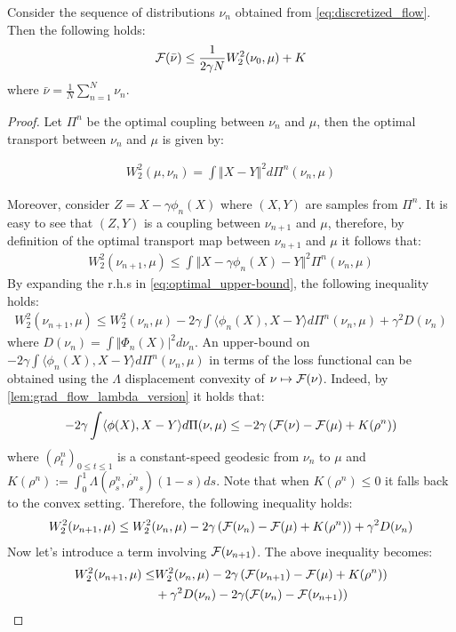 \begin{theorem}
	Consider the sequence of distributions $\nu_n$ obtained from \cref{eq:discretized_flow}. Then the following holds:
	\begin{align}
		{{\mathcal F}}(\bar{\nu})\leq \frac{1}{2\gamma N}W_2^2(\nu_0,\mu) +K
	\end{align}
	where $\bar{\nu}=\frac{1}{N}\sum_{n=1}^N \nu_n$.
\end{theorem}
\begin{proof}
Let $\Pi^n$ be the optimal coupling between $\nu_n$ and $\mu$, then the optimal transport between $\nu_n$ and $\mu$ is given by:

\begin{align}
	W_2^2(\mu,\nu_n)=\int \Vert X-Y \Vert^2 d\Pi^n(\nu_n,\mu)
\end{align}

Moreover, consider $Z=X-\gamma \phi_n(X)$ where $(X,Y)$ are samples from $\Pi^n$. It is easy to see that $(Z,Y)$ is a coupling between $\nu_{n+1}$ and $\mu$, therefore, by definition of the optimal transport map between $\nu_{n+1}$ and $\mu$ it follows that:
\begin{align}\label{eq:optimal_upper-bound}
	W_2^2(\nu_{n+1},\mu)\leq \int \Vert X-\gamma \phi_{n}(X)-Y\Vert^2 \Pi^n(\nu_n,\mu)
\end{align}
By expanding the r.h.s in \cref{eq:optimal_upper-bound}, the following inequality holds:
\begin{align}\label{eq:main_inequality}
	W_2^2(\nu_{n+1},\mu)\leq W_2^2(\nu_{n},\mu) -2\gamma \int \langle \phi_n(X), X-Y \rangle d\Pi^n(\nu_n,\mu)+ \gamma^2D(\nu_n)
\end{align}
where $D(\nu_n) = \int \Vert \Phi_n(X)\vert^2 d\nu_n $.
An upper-bound on $-2\gamma \int \langle \phi_n(X), X-Y \rangle d\Pi^n(\nu_n,\mu) $ in terms of the loss functional can be obtained using the $\Lambda$ displacement convexity of $\nu\mapsto {{\mathcal F}}(\nu)$. Indeed, by \cref{lem:grad_flow_lambda_version} it holds that:
\begin{align}\label{eq:flow_upper-bound}
	-2\gamma \int \langle \phi(X),X-Y \rangle d\Pi(\nu,\mu)
	\leq
	-2\gamma\left({{\mathcal F}}(\nu)- {{\mathcal F}}(\mu) +K(\rho^n)\right)
\end{align}
where $(\rho^n_t)_{0\leq t \leq 1}$ is a constant-speed geodesic from $\nu_n$ to $\mu$ and $K(\rho^n):=\int_0^1 \Lambda(\rho^n_s,\dot{\rho^n}_s)(1-s)ds$. Note that when $K(\rho^n)\leq 0$ it falls back to the convex setting.
Therefore, the following inequality holds:
\begin{align}
	W_2^2(\nu_{n+1},\mu)\leq W_2^2(\nu_{n},\mu) - 2\gamma\left({{\mathcal F}}(\nu_n)- {{\mathcal F}}(\mu) +K(\rho^n)\right) +\gamma^2 D(\nu_n)
\end{align}
Now let's introduce a term involving ${{\mathcal F}}(\nu_{n+1})$. The above inequality becomes:
\begin{align}
	W_2^2(\nu_{n+1},\mu)\leq & W_2^2(\nu_{n},\mu) - 2\gamma\left({{\mathcal F}}(\nu_{n+1})- {{\mathcal F}}(\mu) +K(\rho^n)\right) \\
		&+\gamma^2 D(\nu_n) -2\gamma ({{\mathcal F}}(\nu_n)-{{\mathcal F}}(\nu_{n+1}))
	\label{eq:main_ineq_2}
\end{align}
 

\end{proof}
